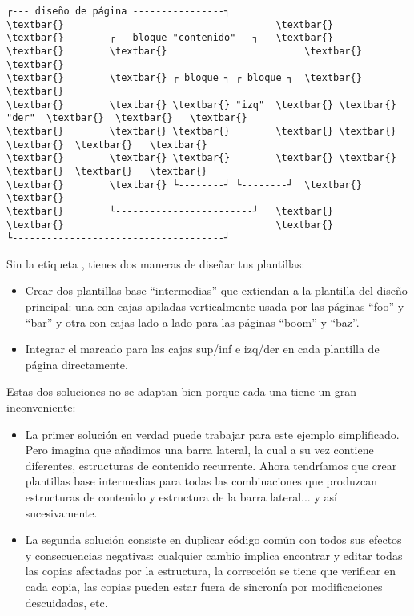 \documentclass[letterpaper,10pt,spanish]{sphinxmanual}
\begin{document}
\begin{Verbatim}[commandchars=\\\{\}]
┌--- diseño de página ----------------┐
\textbar{}                                     \textbar{}
\textbar{}        ┌-- bloque "contenido" --┐   \textbar{}
\textbar{}        \textbar{}                        \textbar{}   \textbar{}
\textbar{}        \textbar{} ┌ bloque ┐ ┌ bloque ┐  \textbar{}   \textbar{}
\textbar{}        \textbar{} \textbar{} "izq"  \textbar{} \textbar{} "der"  \textbar{}  \textbar{}   \textbar{}
\textbar{}        \textbar{} \textbar{}        \textbar{} \textbar{}        \textbar{}  \textbar{}   \textbar{}
\textbar{}        \textbar{} \textbar{}        \textbar{} \textbar{}        \textbar{}  \textbar{}   \textbar{}
\textbar{}        \textbar{} └--------┘ └--------┘  \textbar{}   \textbar{}
\textbar{}        └------------------------┘   \textbar{}
\textbar{}                                     \textbar{}
└-------------------------------------┘
\end{Verbatim}

Sin la etiqueta , tienes dos maneras de diseñar tus plantillas:
\begin{itemize}
\item {} 
Crear dos plantillas base ``intermedias'' que extiendan a la plantilla del diseño principal: una con cajas apiladas verticalmente usada por las páginas ``foo'' y ``bar'' y otra con cajas lado a lado para las páginas ``boom'' y ``baz''.

\item {} 
Integrar el marcado para las cajas sup/inf e izq/der en cada plantilla de página directamente.

\end{itemize}

Estas dos soluciones no se adaptan bien porque cada una tiene un gran inconveniente:
\begin{itemize}
\item {} 
La primer solución en verdad puede trabajar para este ejemplo simplificado. Pero imagina que añadimos una barra lateral, la cual a su vez contiene diferentes, estructuras de contenido recurrente. Ahora tendríamos que crear plantillas base intermedias para todas las combinaciones que produzcan estructuras de contenido y estructura de la barra lateral... y así sucesivamente.

\item {} 
La segunda solución consiste en duplicar código común con todos sus efectos y consecuencias negativas: cualquier cambio implica encontrar y editar todas las copias afectadas por la estructura, la corrección se tiene que verificar en cada copia, las copias pueden estar fuera de sincronía por modificaciones descuidadas, etc.

\end{itemize}
\end{document}
